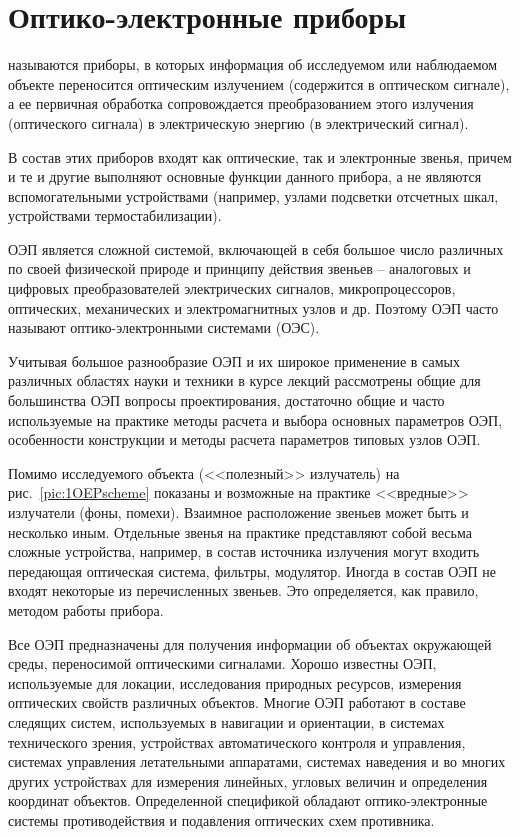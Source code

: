 \chapter{Оптико-электронные приборы}
\label{ch:tufte-design}

 называются приборы, в которых информация об исследуемом или наблюдаемом объекте переносится оптическим излучением (содержится в оптическом сигнале), а ее первичная обработка сопровождается преобразованием этого излучения (оптического сигнала) в электрическую энергию (в электрический сигнал). 

В состав этих приборов входят как оптические, так и электронные звенья, причем и те и другие выполняют основные функции данного прибора, а не являются вспомогательными устройствами (например, узлами подсветки отсчетных шкал, устройствами термостабилизации).

ОЭП является сложной системой, включающей в себя большое число различных по своей физической природе и принципу действия звеньев -- аналоговых и цифровых преобразователей электрических сигналов, микропроцессоров, оптических, механических и электромагнитных узлов и др. Поэтому ОЭП часто называют оптико-электронными системами (ОЭС). 

Учитывая большое разнообразие ОЭП и их широкое применение в самых различных областях науки и техники  в курсе лекций рассмотрены общие для большинства ОЭП вопросы проектирования, достаточно общие и часто используемые на практике методы расчета и выбора основных параметров ОЭП, особенности конструкции и методы расчета параметров типовых узлов ОЭП.

Помимо исследуемого объекта (<<полезный>> излучатель) на рис.~\ref{pic:1OEPscheme} показаны и возможные на практике <<вредные>> излучатели (фоны, помехи). Взаимное расположение звеньев может быть и несколько иным. Отдельные звенья на практике представляют собой весьма сложные устройства, например, в состав источника излучения могут входить передающая оптическая система, фильтры, модулятор. Иногда в состав ОЭП не входят некоторые из перечисленных звеньев. Это определяется, как правило, методом работы прибора.

Все ОЭП предназначены для получения информации об объектах окружающей среды, переносимой оптическими сигналами. Хорошо известны ОЭП, используемые для локации, исследования природных ресурсов, измерения оптических свойств различных объектов. Многие ОЭП работают в составе следящих систем, используемых в навигации и ориентации, в системах технического зрения, устройствах автоматического контроля и управления, системах управления летательными аппаратами, системах наведения и во многих других устройствах для измерения линейных, угловых величин и определения координат объектов. Определенной спецификой обладают оптико-электронные системы противодействия и подавления оптических схем противника.

